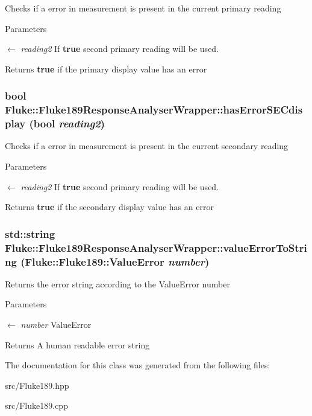 \label{classFluke_1_1Fluke189ResponseAnalyserWrapper_ac1f09299bd05dc25cb95cb7e113ac849}
Checks if a error in measurement is present in the current primary reading 
\begin{DoxyParams}{Parameters}
\item[\mbox{$\leftarrow$} {\em reading2}]If {\bfseries true} second primary reading will be used. \end{DoxyParams}
\begin{DoxyReturn}{Returns}
{\bfseries true} if the primary display value has an error 
\end{DoxyReturn}
\hypertarget{classFluke_1_1Fluke189ResponseAnalyserWrapper_a6a90a44e2abfa2d425445e951004e7d9}{
\subsubsection[{hasErrorSECdisplay}]{\setlength{\rightskip}{0pt plus 5cm}bool Fluke::Fluke189ResponseAnalyserWrapper::hasErrorSECdisplay (bool {\em reading2})}}
\label{classFluke_1_1Fluke189ResponseAnalyserWrapper_a6a90a44e2abfa2d425445e951004e7d9}
Checks if a error in measurement is present in the current secondary reading 
\begin{DoxyParams}{Parameters}
\item[\mbox{$\leftarrow$} {\em reading2}]If {\bfseries true} second primary reading will be used. \end{DoxyParams}
\begin{DoxyReturn}{Returns}
{\bfseries true} if the secondary display value has an error 
\end{DoxyReturn}
\hypertarget{classFluke_1_1Fluke189ResponseAnalyserWrapper_aaa5b49da3d9ef2a61bc9b2bf11f4edee}{
\subsubsection[{valueErrorToString}]{\setlength{\rightskip}{0pt plus 5cm}std::string Fluke::Fluke189ResponseAnalyserWrapper::valueErrorToString (Fluke::Fluke189::ValueError {\em number})}}
\label{classFluke_1_1Fluke189ResponseAnalyserWrapper_aaa5b49da3d9ef2a61bc9b2bf11f4edee}
Returns the error string according to the ValueError number 
\begin{DoxyParams}{Parameters}
\item[\mbox{$\leftarrow$} {\em number}]ValueError \end{DoxyParams}
\begin{DoxyReturn}{Returns}
A human readable error string 
\end{DoxyReturn}


The documentation for this class was generated from the following files:\begin{DoxyCompactItemize}
\item 
src/Fluke189.hpp\item 
src/Fluke189.cpp\end{DoxyCompactItemize}
